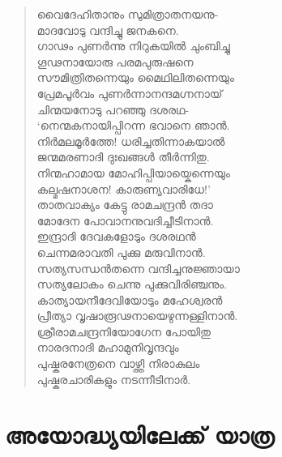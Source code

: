 \begin{verse}
വൈദേഹിതാനും സുമിത്രാതനയനു-\\
മാദവോടു വന്ദിച്ചു ജനകനെ.\\
ഗാഢം പുണര്‍ന്നു നിറുകയില്‍ ചുംബിച്ചു\\
ഗൂഢനായോരു പരമപുരുഷനെ\\
സൗമിത്രിതന്നെയും മൈഥിലിതന്നെയും\\
പ്രേമപൂര്‍വം പുണര്‍ന്നാനന്ദമഗ്നനായ്\\
ചിന്മയനോടു പറഞ്ഞു ദശരഥ-\\
‘നെന്മകനായിപ്പിറന്ന ഭവാനെ ഞാന്‍.\\
നിര്‍മലമൂര്‍ത്തേ! ധരിച്ചതിന്നാകയാല്‍\\
ജന്മമരണാദി ദുഃഖങ്ങള്‍ തീര്‍ന്നിതു.\\
നിന്മഹാമായ മോഹിപ്പിയായ്കെന്നെയും\\
കല്മഷനാശന! കാരുണ്യവാരിധേ!’\\
താതവാക്യം കേട്ടു രാമചന്ദ്രന്‍ തദാ\\
മോദേന പോവാനനുവദിച്ചീടിനാന്‍.\\
ഇന്ദ്രാദി ദേവകളോടും ദശരഥന്‍\\
ചെന്നമരാവതി പുക്കു മരുവിനാന്‍.\\
സത്യസന്ധന്‍തന്നെ വന്ദിച്ചനുജ്ഞായാ\\
സത്യലോകം ചെന്നു പുക്കുവിരിഞ്ചനും.\\
കാത്യായനീദേവിയോടും മഹേശ്വരന്‍\\
പ്രീത്യാ വൃഷാരൂഢനായെഴുന്നള്ളിനാന്‍.\\
ശ്രീരാമചന്ദ്രനിയോഗേന പോയിതു\\
നാരദനാദി മഹാമുനിവൃന്ദവും\\
പുഷ്കരനേത്രനെ വാഴ്ത്തി നിരാകുലം\\
പുഷ്കരചാരികളും നടന്നീടിനാര്‍.
\end{verse}

\newpage

\section{അയോദ്ധ്യയിലേക്ക് യാത്ര}

